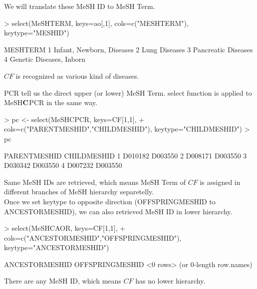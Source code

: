 \documentclass[11pt]{article}
\begin{document}
We will translate these MeSH ID to MeSH Term. 
\begin{center}
\begin{Schunk}
\begin{Sinput}
> select(MeSHTERM, keys=ao[,1], cols=c("MESHTERM"), keytype="MESHID")
\end{Sinput}
\begin{Soutput}
                   MESHTERM
1 Infant, Newborn, Diseases
2             Lung Diseases
3       Pancreatic Diseases
4  Genetic Diseases, Inborn
\end{Soutput}
\end{Schunk}
\end{center}
$CF$ is recognized as various kind of diseases.


PCR tell us the direct upper (or lower) MeSH Term. select function is applied to MeSH$\bf{C}$PCR in the same way.
\begin{center}
\begin{Schunk}
\begin{Sinput}
> pc <- select(MeSHCPCR, keys=CF[1,1],
+        cols=c("PARENTMESHID","CHILDMESHID"), keytype="CHILDMESHID")
> pc
\end{Sinput}
\begin{Soutput}
  PARENTMESHID CHILDMESHID
1      D010182     D003550
2      D008171     D003550
3      D030342     D003550
4      D007232     D003550
\end{Soutput}
\end{Schunk}
\end{center}
Same MeSH IDs are retrieved, which means MeSH Term of $CF$ is assigned in different branches of MeSH hierarchy separetelly.\\



Once we set keytype to opposite direction (OFFSPRINGMESHID to ANCESTORMESHID), we can also retrieved MeSH ID in lower hierarchy.
\begin{center}
\begin{Schunk}
\begin{Sinput}
> select(MeSHCAOR, keys=CF[1,1], 
+        cols=c("ANCESTORMESHID","OFFSPRINGMESHID"), keytype="ANCESTORMESHID")
\end{Sinput}
\begin{Soutput}
[1] ANCESTORMESHID  OFFSPRINGMESHID
<0 rows> (or 0-length row.names)
\end{Soutput}
\end{Schunk}
\end{center}
There are any MeSH ID, which means $CF$ has no lower hierarchy.\\\\




\end{document}
